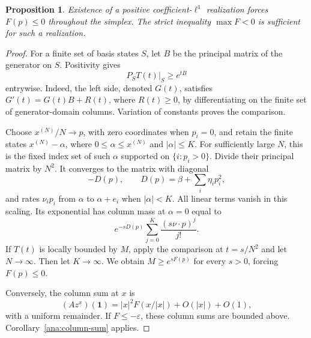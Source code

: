 \documentclass[reqno]{amsart}
\newtheorem{proposition}[theorem]{Proposition}
\theoremstyle{definition}
\theoremstyle{remark}
\begin{document}
\begin{proposition}\label{ana:quadratic-growth}
Existence of a positive coefficient-\(\ell^1\) realization forces
\(F(p)\le0\) throughout the simplex.  The strict inequality
\(\max F<0\) is sufficient for such a realization.
\end{proposition}
\begin{proof}
For a finite set of basis states \(S\), let \(B\) be the principal
matrix of the generator on \(S\).  Positivity gives
\[
 P_ST(t)|_S\ge e^{tB}
\]
entrywise.  Indeed, the left side, denoted \(G(t)\), satisfies
\(G'(t)=G(t)B+R(t)\), where \(R(t)\ge0\), by differentiating on the
finite set of generator-domain columns.  Variation of constants proves
the comparison.

Choose \(x^{(N)}/N\to p\), with zero coordinates when \(p_i=0\), and retain
the finite states \(x^{(N)}-\alpha\), where \(0\le\alpha\le x^{(N)}\)
and \(|\alpha|\le K\).  For sufficiently large \(N\), this is the
fixed index set of such \(\alpha\) supported on \(\{i:p_i>0\}\).
Divide their principal matrix by \(N^2\).  It converges to the matrix with diagonal
\[
 -D(p),\qquad D(p)=\beta+\sum_i\eta_i p_i^2,
\]
and rates \(\nu_i p_i\) from \(\alpha\) to \(\alpha+e_i\) when
\(|\alpha|<K\).  All linear terms vanish in this scaling.  Its exponential
has column mass at \(\alpha=0\) equal to
\[
 e^{-sD(p)}\sum_{j=0}^K\frac{(s\nu\cdot p)^j}{j!}.
\]
If \(T(t)\) is locally bounded by \(M\), apply the comparison at
\(t=s/N^2\) and let \(N\to\infty\).  Then let \(K\to\infty\).
We obtain \(M\ge e^{sF(p)}\) for every \(s>0\), forcing \(F(p)\le0\).

Conversely, the column sum at \(x\) is
\[
 (Az^x)(\mathbf1)
 =|x|^2 F(x/|x|)+O(|x|)+O(1),
\]
with a uniform remainder.  If \(F\le-\varepsilon\), these column sums
are bounded above.  Corollary~\ref{ana:column-sum} applies.
\end{proof}
\end{document}
